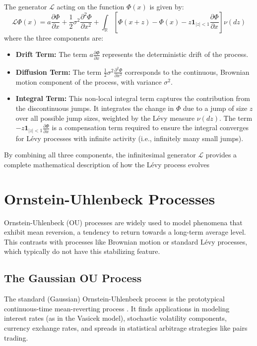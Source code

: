 \documentclass[11pt,twoside,openright]{report}
\begin{document}
The generator $\mathcal{L}$ acting on the function $\Phi(x)$ is given by:
\begin{equation}
\mathcal{L}\Phi(x) = a \frac{\partial \Phi}{\partial x} + \frac{1}{2}\sigma^2 \frac{\partial^2 \Phi}{\partial x^2} + \int_{\mathbb{R}} \left[ \Phi(x+z) - \Phi(x) - z \mathbf{1}_{|z|<1} \frac{\partial \Phi}{\partial x} \right] \nu(dz)
\label{eq:generator_definition}
\end{equation}
where the three components are:
\begin{itemize}
    \item \textbf{Drift Term:} The term $a \frac{\partial \Phi}{\partial x}$ represents the deterministic drift of the process.
    \item \textbf{Diffusion Term:} The term $\frac{1}{2}\sigma^2 \frac{\partial^2 \Phi}{\partial x^2}$ corresponds to the continuous, Brownian motion component of the process, with variance $\sigma^2$.
    \item \textbf{Integral Term:} This non-local integral term captures the contribution from the discontinuous jumps. It integrates the change in $\Phi$ due to a jump of size $z$ over all possible jump sizes, weighted by the Lévy measure $\nu(dz)$. The term $- z \mathbf{1}_{|z|<1} \frac{\partial \Phi}{\partial x}$ is a compensation term required to ensure the integral converges for Lévy processes with infinite activity (i.e., infinitely many small jumps).
\end{itemize}
By combining all three components, the infinitesimal generator $\mathcal{L}$ provides a complete mathematical description of how the Lévy process evolves

\section{Ornstein-Uhlenbeck Processes}
\label{sec:ou_processes}

Ornstein-Uhlenbeck (OU) processes are widely used to model phenomena that exhibit mean reversion, a tendency to return towards a long-term average level. This contrasts with processes like Brownian motion or standard Lévy processes, which typically do not have this stabilizing feature.

\subsection{The Gaussian OU Process}
\label{subsec:gaussian_ou}

The standard (Gaussian) Ornstein-Uhlenbeck process is the prototypical continuous-time mean-reverting process \cite{karatzas1991brownian}. It finds applications in modeling interest rates (as in the Vasicek model), stochastic volatility components, currency exchange rates, and spreads in statistical arbitrage strategies like pairs trading.
\end{document}
